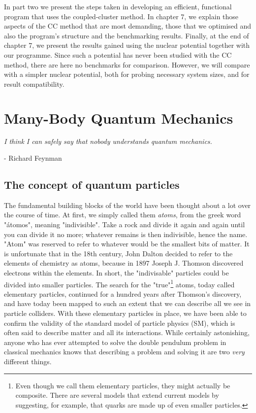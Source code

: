 \documentclass[10pt,twoside]{report}
\begin{document}
	In part two we present the steps taken in developing an efficient, functional program that uses the coupled-cluster method. In chapter 7, we explain those aspects of the CC method that are most demanding, those that we optimised and also the program's structure and the benchmarking results. Finally, at the end of chapter 7, we present the results gained using the nuclear potential together with our programme. Since such a potential has never been studied with the CC method, there are here no benchmarks for comparison. However, we will compare with a simpler nuclear potential, both for probing necessary system sizes, and for result compatibility.
	
	\chapter{Many-Body Quantum Mechanics}
	\label{MBQM | sec | "MBQM chapter"}
	\epigraph{\textit{I think I can safely say that nobody understands quantum mechanics.}}{- Richard Feynman}
	
	\section{The concept of quantum particles}
	The fundamental building blocks of the world have been thought about a lot over the course of time. At first, we simply called them \emph{atoms}, from the greek word "\'{a}tomos", meaning "indivisible". Take a rock and divide it again and again until you can divide it no more; whatever remains is then indivisible, hence the name. "Atom" was reserved to refer to whatever would be the smallest bits of matter. It is unfortunate that in the 18th century, John Dalton decided to refer to the elements of chemistry as atoms, because in 1897 Joseph J. Thomson discovered electrons within the elements. In short, the "indivisable" particles could be divided into smaller particles. The search for the "true"\footnote{Even though we call them elementary particles, they might actually be composite. There are several models that extend current models by suggesting, for example, that quarks are made up of even smaller particles.} atoms, today called elementary particles, continued for a hundred years after Thomson's discovery, and have today been mapped to such an extent that we can describe all we see in particle colliders. With these elementary particles in place, we have been able to confirm the validity of the standard model of particle physics (SM), which is often said to describe matter and all its interactions. While certainly astonishing, anyone who has ever attempted to solve the double pendulum problem in classical mechanics knows that describing a problem and solving it are two \emph{very} different things.\\
	
\end{document}
